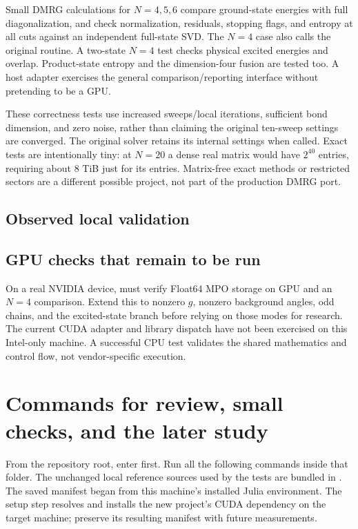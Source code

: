 Small DMRG calculations for $N=4,5,6$ compare ground-state energies with full diagonalization, and check normalization, residuals, stopping flags, and entropy at all cuts against an independent full-state SVD. The $N=4$ case also calls the original  routine. A two-state $N=4$ test checks physical excited energies and overlap. Product-state entropy and the dimension-four fusion are tested too. A host adapter exercises the general comparison/reporting interface without pretending to be a GPU.

These correctness tests use increased sweeps/local iterations, sufficient bond dimension, and zero noise, rather than claiming the original ten-sweep settings are converged. The original solver retains its internal settings when called. Exact tests are intentionally tiny: at $N=20$ a dense real matrix would have $2^{40}$ entries, requiring about 8 TiB just for its entries. Matrix-free exact methods or restricted sectors are a different possible project, not part of the production DMRG port.

\subsection{Observed local validation}


\subsection{GPU checks that remain to be run}
On a real NVIDIA device,  must verify Float64 MPO storage on GPU and an $N=4$ comparison. Extend this to nonzero $g$, nonzero background angles, odd chains, and the excited-state branch before relying on those modes for research. The current CUDA adapter and library dispatch have not been exercised on this Intel-only machine. A successful CPU test validates the shared mathematics and control flow, not vendor-specific execution.

\section{Commands for review, small checks, and the later study}
From the repository root, enter  first. Run all the following commands inside that folder. The unchanged local reference sources used by the tests are bundled in . The saved manifest began from this machine's installed Julia environment. The setup step resolves and installs the new project's CUDA dependency on the target machine; preserve its resulting manifest with future measurements.

